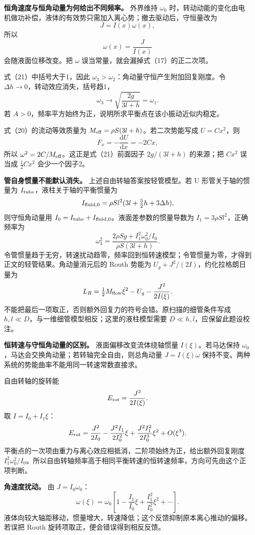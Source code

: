 \documentclass[12pt,a4paper,UTF8]{ctexart}
\begin{document}
\textbf{恒角速度与恒角动量为何给出不同频率。} 外界维持 \(\omega_0\)
时，转动动能的变化由电机做功补偿，液体的有效势只需加入离心势；撤去驱动后，守恒量改为
\[
J=I(x)\omega(x),
\] 所以 \[
\omega(x)=\frac{J}{I(x)}
\] 会随液面位移改变。把 \(\omega\)
误当常量，就会漏掉式（17）的正二次项。

式（21）中括号大于1，因此
\(\omega_3>\omega_2\)：角动量守恒产生附加回复刚度。令
\(\Delta h\to0\)，转动效应消失，括号趋1， \[
\omega_3\to\sqrt{\frac{2g}{3l+h}}=\omega_1.
\] 若 \(A>0\)，频率平方始终为正，说明所求平衡点在该小振动近似内稳定。

式（20）的流动等效质量为 \(M_{\rm eff}=\rho S(3l+h)\)。若二次势能写成
\(U=Cx^2\)，则 \[
F_x=-\frac{\mathrm dU}{\mathrm dx}=-2Cx,
\] 所以 \(\omega^2=2C/M_{\rm eff}\)。这正是式（21）前面因子
\(2g/(3l+h)\) 的来源；把 \(Cx^2\) 误当成 \(\frac12Cx^2\) 会少一个因子2。

\textbf{管自身惯量不能默认消失。} 上述自由转轴答案按轻管模型。若 U
形管关于轴的惯量为 \(I_{\rm tube}\)，液柱关于轴的平衡惯量为 \[
I_{\rm fluid,0}=\rho S l^2(3l+\tfrac52h+3\Delta h),
\] 则守恒角动量用
\(I_0=I_{\rm tube}+I_{\rm fluid,0}\)。液面差参数的惯量导数为
\(I_1=3\rho Sl^2\)，正确频率为 \[
\boxed{\omega_3^2=
\frac{2\rho Sg+I_1^2\omega_0^2/I_0}{\rho S(3l+h)}}.
\]
令管惯量趋于无穷，转速扰动趋零，频率回到恒转速模型；令管惯量为零，才得到正文的轻管结果。角动量消元后的
Routh 势能为 \(U_g+J^2/(2I)\)，约化拉格朗日量为 \[
L_R=\tfrac12 M_{\rm flow}\dot\xi^2-U_g-\frac{J^2}{2I(\xi)}.
\] 不能把最后一项取正，否则额外回复力的符号会错。原扫描的细管条件写成
\(h,l\ll D\)，与一维细管模型相反；这里的液柱模型需要
\(D\ll h,l\)，应保留此题设校注。

\textbf{恒转速与守恒角动量的区别。} 液面偏移改变流体绕轴惯量
\(I(\xi)\)。若马达保持
\(\omega_0\)，马达会交换角动量；若转轴完全自由，则总角动量
\(J=I(\xi)\omega\)
保持不变。两种系统的势能曲率不能用同一转速常数直接求。

自由转轴的旋转能 \[
E_{\rm rot}=\frac{J^2}{2I(\xi)}.
\] 取 \(I=I_0+I_1\xi\)： \[
E_{\rm rot}=
\frac{J^2}{2I_0}
-\frac{J^2I_1}{2I_0^2}\xi
+\frac{J^2I_1^2}{2I_0^3}\xi^2+O(\xi^3).
\]
平衡点的一次项由重力与离心效应相抵消，二阶项始终为正，给出额外回复刚度
\(I_1^2\omega_0^2/I_0\)。所以自由转轴频率高于相同平衡转速的恒转速频率，方向可先由这个正项判断。

\textbf{角速度扰动。} 由 \(J=I_0\omega_0\)： \[
\omega(\xi)=\omega_0\left[1-\frac{I_1}{I_0}\xi
+\frac{I_1^2}{I_0^2}\xi^2+\cdots\right].
\]
液体向较大轴距移动，惯量增大，转速降低；这个反馈抑制原本离心推动的偏移。若误把
Routh 旋转项取正，便会错误得到相反反馈。
\end{document}
